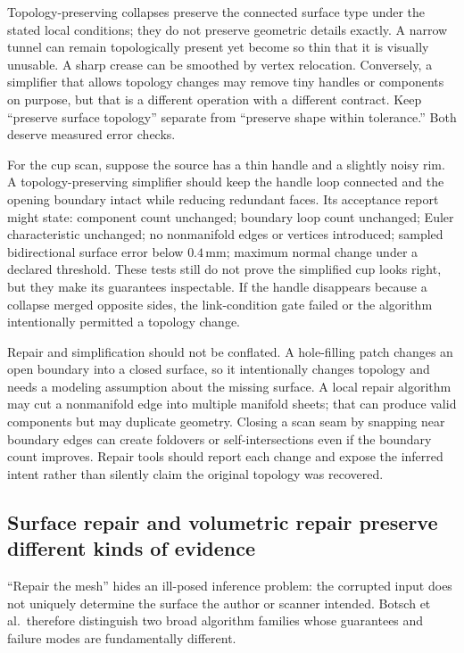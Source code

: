 Topology-preserving collapses preserve the connected surface type under the stated local conditions; they do not preserve geometric details exactly. A narrow tunnel can remain topologically present yet become so thin that it is visually unusable. A sharp crease can be smoothed by vertex relocation. Conversely, a simplifier that allows topology changes may remove tiny handles or components on purpose, but that is a different operation with a different contract. Keep ``preserve surface topology'' separate from ``preserve shape within tolerance.'' Both deserve measured error checks.

For the cup scan, suppose the source has a thin handle and a slightly noisy rim. A topology-preserving simplifier should keep the handle loop connected and the opening boundary intact while reducing redundant faces. Its acceptance report might state: component count unchanged; boundary loop count unchanged; Euler characteristic unchanged; no nonmanifold edges or vertices introduced; sampled bidirectional surface error below \(0.4\,\mathrm{mm}\); maximum normal change under a declared threshold. These tests still do not prove the simplified cup looks right, but they make its guarantees inspectable. If the handle disappears because a collapse merged opposite sides, the link-condition gate failed or the algorithm intentionally permitted a topology change.

Repair and simplification should not be conflated. A hole-filling patch changes an open boundary into a closed surface, so it intentionally changes topology and needs a modeling assumption about the missing surface. A local repair algorithm may cut a nonmanifold edge into multiple manifold sheets; that can produce valid components but may duplicate geometry. Closing a scan seam by snapping near boundary edges can create foldovers or self-intersections even if the boundary count improves. Repair tools should report each change and expose the inferred intent rather than silently claim the original topology was recovered.

\subsection{Surface repair and volumetric repair preserve different kinds of evidence}\label{03-visual-computing-i-ch002-surface-repair-and-volumetric-repair-preserve-different-kinds-of-evidence}

``Repair the mesh'' hides an ill-posed inference problem: the corrupted input does not uniquely determine the surface the author or scanner intended. Botsch et al.~therefore distinguish two broad algorithm families whose guarantees and failure modes are fundamentally different.

